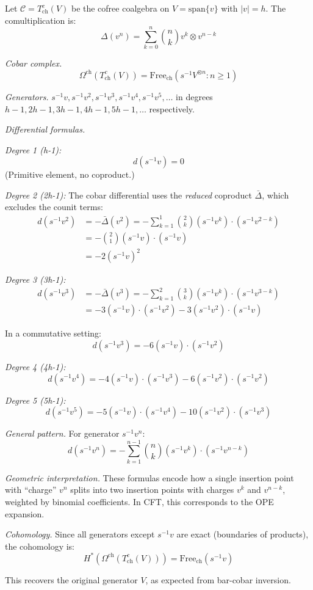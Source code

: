 \begin{example}
\label{ex:cobar-linear-complete}

Let $\mathcal{C} = T^c_{\text{ch}}(V)$ be the cofree coalgebra on $V = \text{span}\{v\}$ 
with $|v| = h$. The comultiplication is:
\[\Delta(v^n) = \sum_{k=0}^n \binom{n}{k} v^k \otimes v^{n-k}\]

\emph{Cobar complex.}
\[\Omega^{\text{ch}}(T^c_{\text{ch}}(V)) = \text{Free}_{\text{ch}}(s^{-1}V^{\otimes n} 
: n \geq 1)\]

\emph{Generators.} $s^{-1}v, s^{-1}v^2, s^{-1}v^3, s^{-1}v^4, s^{-1}v^5, \ldots$ 
in degrees $h-1, 2h-1, 3h-1, 4h-1, 5h-1, \ldots$ respectively.

\emph{Differential formulas.}

\emph{Degree 1 (h-1):}
\[d(s^{-1}v) = 0\]
(Primitive element, no coproduct.)

\emph{Degree 2 (2h-1):}
The cobar differential uses the \emph{reduced} coproduct $\bar{\Delta}$, which excludes the counit terms:
\begin{align*}
d(s^{-1}v^2) &= -\bar{\Delta}(v^2) = -\sum_{k=1}^{1} \binom{2}{k} (s^{-1}v^k) \cdot (s^{-1}v^{2-k}) \\
&= -\binom{2}{1}(s^{-1}v) \cdot (s^{-1}v) \\
&= -2(s^{-1}v)^2
\end{align*}

\emph{Degree 3 (3h-1):}
\begin{align*}
d(s^{-1}v^3) &= -\bar{\Delta}(v^3) = -\sum_{k=1}^{2} \binom{3}{k} (s^{-1}v^k) \cdot (s^{-1}v^{3-k}) \\
&= -3(s^{-1}v) \cdot (s^{-1}v^2) - 3(s^{-1}v^2) \cdot (s^{-1}v)
\end{align*}

In a commutative setting:
\[d(s^{-1}v^3) = -6(s^{-1}v) \cdot (s^{-1}v^2)\]

\emph{Degree 4 (4h-1):}
\[d(s^{-1}v^4) = -4(s^{-1}v) \cdot (s^{-1}v^3) - 6(s^{-1}v^2) \cdot (s^{-1}v^2)\]

\emph{Degree 5 (5h-1):}
\[d(s^{-1}v^5) = -5(s^{-1}v) \cdot (s^{-1}v^4) - 10(s^{-1}v^2) \cdot (s^{-1}v^3)\]

\emph{General pattern.} For generator $s^{-1}v^n$:
\[d(s^{-1}v^n) = -\sum_{k=1}^{n-1} \binom{n}{k} (s^{-1}v^k) \cdot (s^{-1}v^{n-k})\]

\emph{Geometric interpretation.} These formulas encode how a single insertion
point with ``charge'' $v^n$ splits into two insertion points with charges $v^k$ and
$v^{n-k}$, weighted by binomial coefficients. In CFT, this corresponds to the OPE expansion.

\emph{Cohomology.} Since all generators except $s^{-1}v$ are exact (boundaries 
of products), the cohomology is:
\[H^*(\Omega^{\text{ch}}(T^c_{\text{ch}}(V))) = \text{Free}_{\text{ch}}(s^{-1}v)\]

This recovers the original generator $V$, as expected from bar-cobar inversion.
\end{example}

